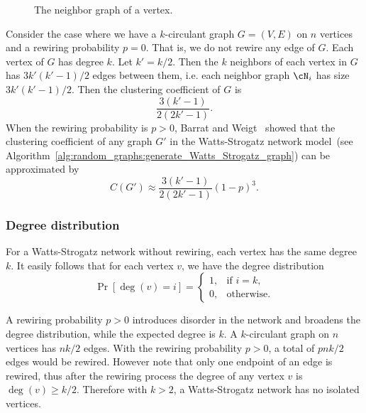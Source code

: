 \begin{figure}[!htbp]
\centering
{}

\caption{The neighbor graph of a vertex.}
\label{fig:random_graphs:neighbor_graph}
\end{figure}

Consider the case where we have a $k$-circulant graph
$G = (V,E)$ on $n$ vertices and a rewiring probability $p = 0$. That
is, we do not rewire any edge of $G$. Each vertex of $G$ has degree
$k$. Let  $k' = k/2$. Then the $k$ neighbors of each vertex in $G$ has
$3k' (k' - 1) / 2$ edges between them, i.e. each neighbor graph
$\cN_i$ has size $3k' (k' - 1) / 2$. Then the clustering coefficient
of $G$ is
\[
\frac{3(k' - 1)} {2(2k' - 1)}.
\]
When the rewiring probability is $p > 0$, Barrat and
Weigt~\cite{BarratWeigt2000} showed that the clustering coefficient of
any graph $G'$ in the Watts-Strogatz network model~(see
Algorithm~\ref{alg:random_graphs:generate_Watts_Strogatz_graph}) can
be approximated by
\[
C(G')
\approx
\frac{3(k' - 1)} {2(2k' - 1)} (1 - p)^3.
\]



\subsubsection{Degree distribution}

For a Watts-Strogatz network without rewiring, each vertex has the
same degree $k$. It easily follows that for each vertex $v$, we have
the degree distribution
\[
\Pr[\deg(v) = i]
=
\begin{cases}
1, & \text{if $i = k$}, \\[4pt]
0, & \text{otherwise}.
\end{cases}
\]

A rewiring probability $p > 0$ introduces disorder in the network and
broadens the degree distribution, while the expected degree is $k$. A
$k$-circulant graph on $n$ vertices has $nk / 2$ edges. With the
rewiring probability $p > 0$, a total of $pnk / 2$ edges would be
rewired. However note that only one endpoint of an edge is rewired,
thus after the rewiring process the degree of any vertex $v$ is
$\deg(v) \geq k/2$. Therefore with $ k > 2$, a Watts-Strogatz network
has no isolated vertices.

